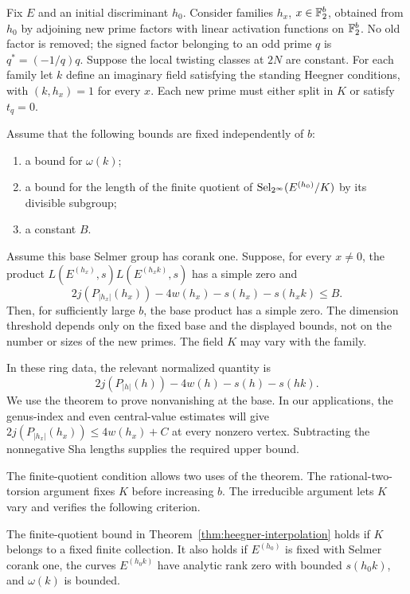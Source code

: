 \begin{theorem}\label{thm:heegner-interpolation}
Fix $E$ and an initial discriminant $h_0$. Consider families
$h_x$, $x\in\mathbb F_2^b$, obtained from $h_0$ by adjoining new prime factors
with linear activation functions on $\mathbb F_2^b$. No old factor is removed;
the signed factor belonging to an odd prime $q$ is
$q^*=(-1/q)q$. Suppose the local twisting classes at $2N$ are constant.
For each family let $k$ define an imaginary field satisfying the standing
Heegner conditions, with $(k,h_x)=1$ for every $x$. Each new prime must
either split in $K$ or satisfy $t_q=0$.

Assume that the following bounds are fixed independently of $b$:
\begin{enumerate}[label=\textup{(\roman*)}]
 \item a bound for $\omega(k)$;
 \item a bound for the length of the finite quotient of
       $\operatorname{Sel}_{2^\infty}(E^{(h_0)}/K)$ by its divisible subgroup;
 \item a constant $B$.
\end{enumerate}
Assume this base Selmer group has corank one. Suppose, for every $x\ne0$,
the product $L(E^{(h_x)},s)L(E^{(h_xk)},s)$ has a simple zero and
\begin{equation}\label{eq:h:interpolation-hypothesis}
 2j(P_{|h_x|}(h_x))-4w(h_x)-s(h_x)-s(h_xk)\le B.
\end{equation}
Then, for sufficiently large $b$, the base product has a simple zero.
The dimension threshold depends only on the fixed base and the displayed
bounds, not on the number or sizes of the new primes. The field $K$ may
vary with the family.
\end{theorem}

In these ring data, the relevant normalized quantity is
\[
       2j(P_{|h|}(h))-4w(h)-s(h)-s(hk).
\]
We use the theorem to prove nonvanishing at the base. In our applications,
the genus-index and even central-value estimates will give
$2j(P_{|h_x|}(h_x))\le4w(h_x)+C$ at every nonzero vertex. Subtracting
the nonnegative Sha lengths supplies the required upper bound.

The finite-quotient condition allows two uses of the theorem. The
rational-two-torsion argument fixes $K$ before increasing $b$. The
irreducible argument lets $K$ vary and verifies the following criterion.

\begin{lemma}\label{lem:h:base-selmer-bound}
The finite-quotient bound in Theorem~\ref{thm:heegner-interpolation} holds
if $K$ belongs to a fixed finite collection. It also holds if
$E^{(h_0)}$ is fixed with Selmer corank one, the curves
$E^{(h_0k)}$ have analytic rank zero with bounded $s(h_0k)$, and
$\omega(k)$ is bounded.
\end{lemma}

